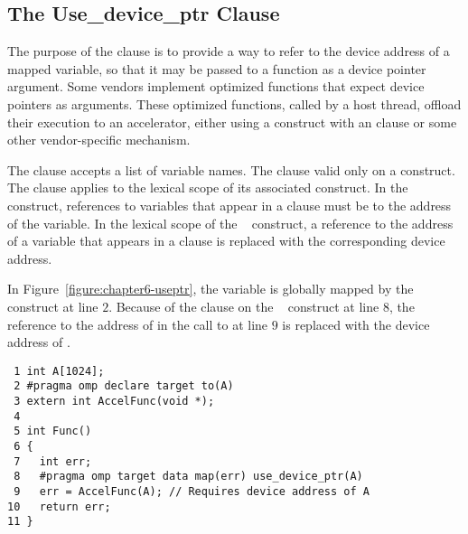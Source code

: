 \subsection{The Use\_device\_ptr Clause}
\label{ssec:06.use_device_ptr-clause}

The purpose of the  clause is
to provide a way to refer to the device address of a mapped variable,
so that it may be passed to a function as a device pointer argument.
Some vendors implement optimized functions that expect device pointers as
arguments.  These optimized functions, called by a host thread, offload their
execution to an accelerator, either using a  construct with an
 clause or some other vendor-specific mechanism.

The  clause accepts a list of variable names.  The clause
valid only on a  construct.  The clause applies to the
lexical scope of its associated  construct.  In
the construct, references to variables that appear in a  clause must
be to the address of the variable.  In the lexical scope of the
~ construct, a reference to the address of a variable
that appears in a  clause is replaced with the
corresponding device address.

In Figure~\ref{figure:chapter6-useptr}, the variable  is globally mapped by
the ~ construct at line $2$.  Because of the
 clause on the ~ construct at line
$8$, the reference to the address of  in the call to  at line
$9$ is replaced with the device address of .

\begin{figure*}[!tb]
\begin{verbatim}
 1 int A[1024];
 2 #pragma omp declare target to(A)
 3 extern int AccelFunc(void *);
 4 
 5 int Func()
 6 {
 7   int err;
 8   #pragma omp target data map(err) use_device_ptr(A)
 9   err = AccelFunc(A); // Requires device address of A
10   return err;
11 }
\end{verbatim}
\caption{ \textbf {Example of the use\_device\_ptr clause} -- \small
          Replace the reference to the host address of \texttt{A} in the lexical
          scope of the \texttt{target data} construct with
          the device address of \texttt{A}.
        }
\label{figure:chapter6-useptr}
\end{figure*}

